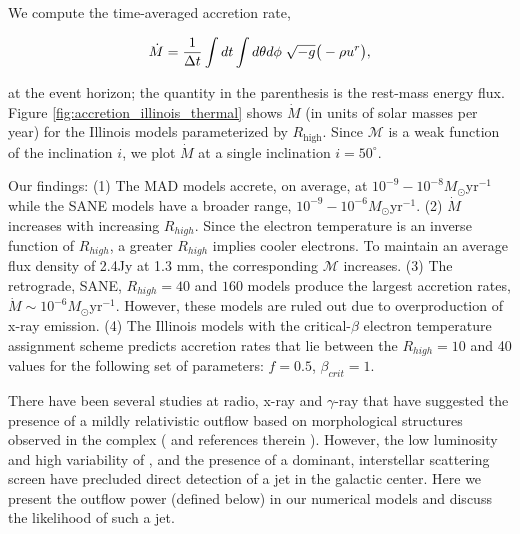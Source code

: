 We compute the time-averaged accretion rate,

\begin{equation}
    \dot{M} = \frac{1}{\Delta t}\int dt\int d\theta d\phi\hspace{0.1cm}\sqrt{-g}\big(-\rho u^{r}\big),
\end{equation}

at the event horizon; the quantity in the parenthesis is the rest-mass energy flux. Figure \ref{fig:accretion_illinois_thermal} shows $\dot{M}$ (in units of solar masses per year) for the Illinois models parameterized by $R_\mathrm{high}$. Since $\mathcal{M}$ is a weak function of the inclination $i$, we plot $\dot{M}$ at a single inclination $i=50^{\circ}$.

Our findings: (1) The MAD models accrete, on average, at $10^{-9}-10^{-8} M_{\odot}$yr$^{-1}$ while the SANE models have a broader range, $10^{-9}-10^{-6} M_{\odot}$yr$^{-1}$. (2) $\dot{M}$ increases with increasing $R_{high}$. Since the electron temperature is an inverse function of $R_{high}$, a greater $R_{high}$ implies cooler electrons. To maintain an average flux density of 2.4Jy at 1.3 mm, the corresponding $\mathcal{M}$ increases. 
(3) The retrograde, SANE, $R_{high}=40$ and $160$ models produce the largest accretion rates, $\dot{M}\sim 10^{-6}M_{\odot}$yr$^{-1}$. However, these models are ruled out due to overproduction of x-ray emission. (4) The Illinois models with the critical-$\beta$ electron temperature assignment scheme predicts accretion rates that lie between the $R_{high}=10$ and 40 values for the following set of parameters: $f=0.5$, $\beta_{crit}=1$.

There have been several studies at radio, x-ray and $\gamma$-ray that have suggested the presence of a mildly relativistic outflow  based on morphological structures observed in the \sgra complex (\citealt{2012AAS...22051303S,Li_2013,2019ApJ...875...44Z} and references therein ). However, the low luminosity and high variability of \sgra, and the presence of a dominant, interstellar scattering screen  have precluded direct detection of a jet in the galactic center. Here we present the outflow power (defined below) in our numerical models and discuss the likelihood of such a jet.

